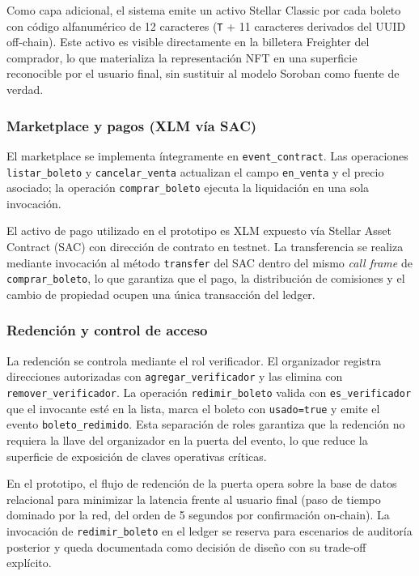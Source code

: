 Como capa adicional, el sistema emite un activo Stellar Classic por cada boleto con código alfanumérico de 12 caracteres (\texttt{T} + 11 caracteres derivados del UUID off-chain). Este activo es visible directamente en la billetera Freighter del comprador, lo que materializa la representación NFT en una superficie reconocible por el usuario final, sin sustituir al modelo Soroban como fuente de verdad.

\subsubsection{Marketplace y pagos (XLM vía SAC)}

El marketplace se implementa íntegramente en \texttt{event\_contract}. Las operaciones \texttt{listar\_boleto} y \texttt{cancelar\_venta} actualizan el campo \texttt{en\_venta} y el precio asociado; la operación \texttt{comprar\_boleto} ejecuta la liquidación en una sola invocación.

El activo de pago utilizado en el prototipo es XLM expuesto vía Stellar Asset Contract (SAC) con dirección de contrato  en testnet. La transferencia se realiza mediante invocación al método \texttt{transfer} del SAC dentro del mismo \textit{call frame} de \texttt{comprar\_boleto}, lo que garantiza que el pago, la distribución de comisiones y el cambio de propiedad ocupen una única transacción del ledger.

\subsubsection{Redención y control de acceso}

La redención se controla mediante el rol verificador. El organizador registra direcciones autorizadas con \texttt{agregar\_verificador} y las elimina con \texttt{remover\_verificador}. La operación \texttt{redimir\_boleto} valida con \texttt{es\_verificador} que el invocante esté en la lista, marca el boleto con \texttt{usado=true} y emite el evento \texttt{boleto\_redimido}. Esta separación de roles garantiza que la redención no requiera la llave del organizador en la puerta del evento, lo que reduce la superficie de exposición de claves operativas críticas.

En el prototipo, el flujo de redención de la puerta opera sobre la base de datos relacional para minimizar la latencia frente al usuario final (paso de tiempo dominado por la red, del orden de 5 segundos por confirmación on-chain). La invocación de \texttt{redimir\_boleto} en el ledger se reserva para escenarios de auditoría posterior y queda documentada como decisión de diseño con su trade-off explícito.

